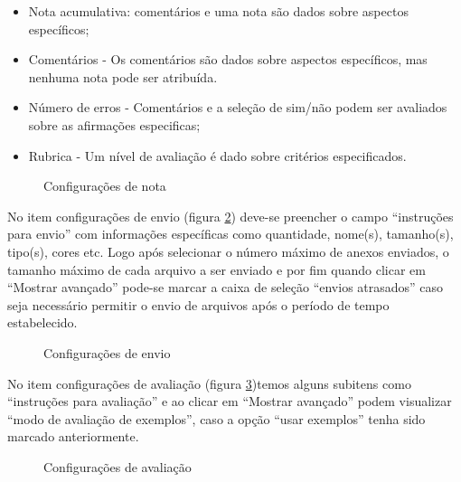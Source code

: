 \begin{itemize}
 \item Nota acumulativa: comentários e uma nota são dados sobre aspectos específicos;
 \item Comentários - Os comentários são dados sobre aspectos específicos, mas nenhuma nota pode ser atribuída.
 \item Número de erros - Comentários e a seleção de sim/não podem ser avaliados sobre as afirmações especificas;
 \item Rubrica - Um nível de avaliação é dado sobre critérios especificados.
 \end{itemize}

 \begin{figure}
 \begin{center}
  \caption{Configurações de nota}
  \label{fig:config_nota}
 \end{center}
\end{figure}

No item configurações de envio (figura \ref{fig:config_envio}) deve-se preencher o campo “instruções para envio” com informações específicas como quantidade, nome(s), tamanho(s), tipo(s), cores etc. Logo após selecionar o número máximo de anexos enviados, o tamanho máximo de cada arquivo a ser enviado e por fim quando clicar em “Mostrar avançado” pode-se marcar a caixa de seleção “envios atrasados” caso seja necessário permitir o envio de arquivos após o período de tempo estabelecido.

 \begin{figure}
 \begin{center}
  \caption{Configurações de envio}
  \label{fig:config_envio}
 \end{center}
\end{figure}

No item configurações de avaliação (figura \ref{fig:config_ava})temos alguns subitens como “instruções para avaliação” e ao clicar em “Mostrar avançado” podem visualizar “modo de avaliação de exemplos”, caso a opção “usar exemplos” tenha sido marcado anteriormente.

 \begin{figure}
 \begin{center}
  \caption{Configurações de avaliação}
  \label{fig:config_ava}
 \end{center}
\end{figure}

